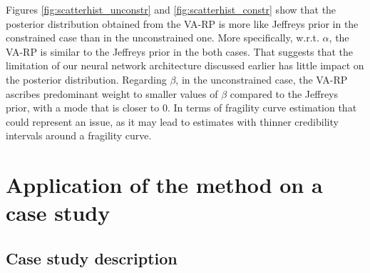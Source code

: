 Figures \ref{fig:scatterhist_unconstr} and \ref{fig:scatterhist_constr} show that the posterior distribution obtained from the VA-RP is more like Jeffreys prior %
in the constrained case than in the unconstrained one. 
More specifically, w.r.t. $\alpha$, the VA-RP is similar to the Jeffreys prior in the both cases. That suggests that the limitation of our neural network architecture discussed earlier has little impact on the posterior distribution.
Regarding $\beta$,
in the unconstrained case, the VA-RP ascribes predominant weight to smaller values of $\beta$ compared to the Jeffreys prior, with a mode that is closer to $0$. In terms of fragility curve estimation that could represent an issue, as it may lead to estimates with thinner credibility intervals around a fragility curve. %









\section{Application of the method on a case study}


\subsection{Case study description}


